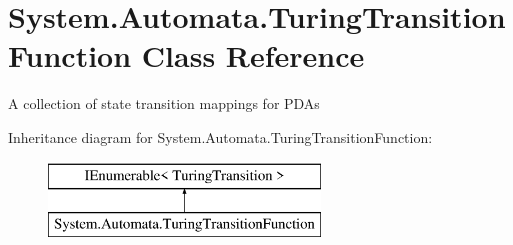 \hypertarget{class_system_1_1_automata_1_1_turing_transition_function}{}\section{System.\+Automata.\+Turing\+Transition\+Function Class Reference}
\label{class_system_1_1_automata_1_1_turing_transition_function}


A collection of state transition mappings for P\+D\+As  


Inheritance diagram for System.\+Automata.\+Turing\+Transition\+Function\+:\begin{figure}[H]
\begin{center}
\leavevmode
\includegraphics[height=2.000000cm]{class_system_1_1_automata_1_1_turing_transition_function}
\end{center}
\end{figure}
